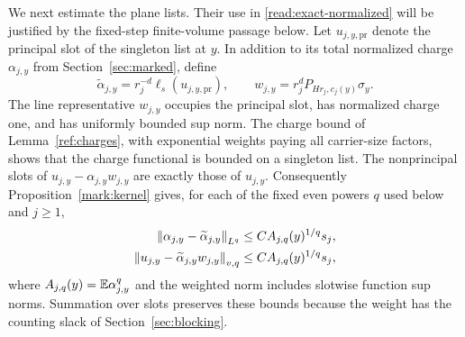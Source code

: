 We next estimate the plane lists.  Their use in
\eqref{read:exact-normalized} will be justified by the fixed-step
finite-volume passage below.
Let $u_{j,y,\mathrm{pr}}$ denote the principal slot of the singleton
list at $y$.  In addition to its total normalized charge $\alpha_{j,y}$
from Section~\ref{sec:marked}, define
\begin{equation}
 \widetilde\alpha_{j,y}
       =r_j^{-d}\ell_s(u_{j,y,\mathrm{pr}}),
 \qquad
 w_{j,y}=r_j^d P_{Hr_j,c_j(y)}\sigma_y.
 \label{read:local-charge}
\end{equation}
The line representative $w_{j,y}$ occupies the principal slot, has
normalized charge one, and has uniformly bounded sup norm.  The charge
bound of Lemma~\ref{ref:charges}, with exponential weights paying
all carrier-size factors, shows that the charge functional is bounded
on a singleton list.  The nonprincipal slots of
$u_{j,y}-\alpha_{j,y}w_{j,y}$ are exactly those of $u_{j,y}$.
Consequently Proposition~\ref{mark:kernel} gives, for each of the fixed
even powers $q$ used below and $j\ge1$,
\begin{align}
 \left\lVert\alpha_{j,y}-\widetilde\alpha_{j,y}\right\rVert_{L^q}
   &\le C A_{j,q}(y)^{1/q}s_j,\\
 \left\lVert u_{j,y}-\widetilde\alpha_{j,y}w_{j,y}\right\rVert_{v,q}
   &\le C A_{j,q}(y)^{1/q}s_j,
 \label{read:principal-replacement}
\end{align}
where $A_{j,q}(y)=\mathbb E\alpha_{j,y}^q$ and the weighted norm includes
slotwise function sup norms.  Summation over slots preserves these
bounds because the weight has the counting slack of
Section~\ref{sec:blocking}.

